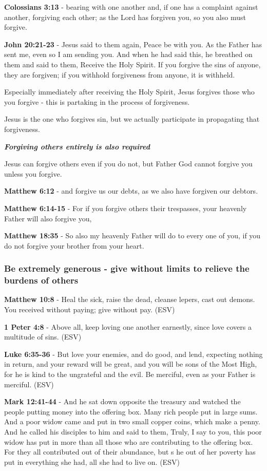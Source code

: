 \documentclass[11pt]{article}
\begin{document}
\textbf{Colossians 3:13} - bearing with one another and, if one has a complaint against another, forgiving each other; as the Lord has forgiven you, so you also must forgive.

\textbf{John 20:21-23} - Jesus said to them again, Peace be with you. As the Father has sent me, even so I am sending you. And when he had said this, he breathed on them and said to them, Receive the Holy Spirit. If you forgive the sins of anyone, they are forgiven; if you withhold forgiveness from anyone, it is withheld.

Especially immediately after receiving the Holy Spirit, Jesus forgives those who you forgive - this is partaking in the process of forgiveness.

Jesus is the one who forgives sin, but we actually participate in propagating that forgiveness.

\emph{\textbf{Forgiving others entirely is also required}}

Jesus can forgive others even if you do not, but Father God cannot forgive you unless you forgive.

\textbf{Matthew 6:12} - and forgive us our debts, as we also have forgiven our debtors.

\textbf{Matthew 6:14-15} - For if you forgive others their trespasses, your heavenly Father will also forgive you,

\textbf{Matthew 18:35} - So also my heavenly Father will do to every one of you, if you do not forgive your brother from your heart.

\subsubsection{Be extremely generous - give without limits to relieve the burdens of others}
\label{sec:orgc82697b}
\textbf{Matthew 10:8} - Heal the sick, raise the dead, cleanse lepers, cast out demons. You received without paying; give without pay. (ESV)

\textbf{1 Peter 4:8} - Above all, keep loving one another earnestly, since love covers a multitude of sins. (ESV)

\textbf{Luke 6:35-36} - But love your enemies, and do good, and lend, expecting nothing in return, and your reward will be great, and you will be sons of the Most High, for he is kind to the ungrateful and the evil. Be merciful, even as your Father is merciful. (ESV)

\textbf{Mark 12:41-44} - And he sat down opposite the treasury and watched the people putting money into the offering box. Many rich people put in large sums. And a poor widow came and put in two small copper coins, which make a penny. And he called his disciples to him and said to them, Truly, I say to you, this poor widow has put in more than all those who are contributing to the offering box. For they all contributed out of their abundance, but s he out of her poverty has put in everything she had, all she had to live on. (ESV)
\end{document}
